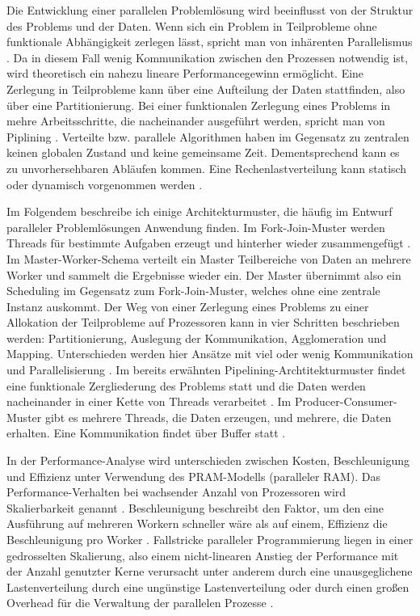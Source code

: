 \documentclass[a4paper,12pt,twoside]{article}
\begin{document}
Die Entwicklung einer parallelen Problemlösung wird beeinflusst von der Struktur des Problems und der Daten. Wenn sich ein Problem in Teilprobleme ohne funktionale Abhängigkeit zerlegen lässt, spricht man von inhärenten Parallelismus {\autocite[S. 321f]{Bengel2008}}. Da in diesem Fall wenig Kommunikation zwischen den Prozessen notwendig ist, wird theoretisch ein nahezu lineare Performancegewinn ermöglicht. Eine Zerlegung in Teilprobleme kann über eine Aufteilung der Daten stattfinden, also über eine Partitionierung. Bei einer funktionalen Zerlegung eines Problems in mehre Arbeitsschritte, die nacheinander ausgeführt werden, spricht man von Piplining {\autocite[S. 324]{Bengel2008}}. Verteilte bzw. parallele Algorithmen haben im Gegensatz zu zentralen keinen globalen Zustand und keine gemeinsame Zeit. Dementsprechend kann es zu unvorhersehbaren Abläufen kommen. Eine Rechenlastverteilung kann statisch oder dynamisch vorgenommen werden {\autocite{Bengel2008}}.

Im Folgendem beschreibe ich einige Architekturmuster, die häufig im Entwurf paralleler Problemlösungen Anwendung finden. Im Fork-Join-Muster werden Threads für bestimmte Aufgaben erzeugt und hinterher wieder zusammengefügt {\autocite[S. 109]{Rauber2013}}. Im Master-Worker-Schema verteilt ein Master Teilbereiche von Daten an mehrere Worker und sammelt die Ergebnisse wieder ein. Der Master übernimmt also ein Scheduling im Gegensatz zum Fork-Join-Muster, welches ohne eine zentrale Instanz auskommt. Der Weg von einer Zerlegung eines Problems zu einer Allokation der Teilprobleme auf Prozessoren kann in vier Schritten beschrieben werden: Partitionierung, Auslegung der Kommunikation, Agglomeration und Mapping. Unterschieden werden hier Ansätze mit viel oder wenig Kommunikation und Parallelisierung {\autocite[S. 326f]{Bengel2008}}. Im bereits erwähnten Pipelining-Archtitekturmuster findet eine funktionale Zergliederung des Problems statt und die Daten werden nacheinander in einer Kette von Threads verarbeitet {\autocite[S. 111]{Rauber2013}}. Im Producer-Consumer-Muster gibt es mehrere Threads, die Daten erzeugen, und mehrere, die Daten erhalten. Eine Kommunikation findet über Buffer statt  {\autocite[S. 112]{Rauber2013}}.

In der Performance-Analyse wird unterschieden zwischen Kosten, Beschleunigung und Effizienz unter Verwendung des PRAM-Modells (paralleler RAM). Das Performance-Verhalten bei wachsender Anzahl von Prozessoren wird Skalierbarkeit genannt {\cite{Rauber2013}}. Beschleunigung beschreibt den Faktor, um den eine Ausführung auf mehreren Workern schneller wäre als auf einem, Effizienz die Beschleunigung pro Worker {\autocite[S. 56]{McCool2012}}. Fallstricke paralleler Programmierung liegen in einer gedrosselten Skalierung, also einem nicht-linearen Anstieg der Performance mit der Anzahl genutzter Kerne verursacht unter anderem durch eine unausgeglichene Lastenverteilung durch eine ungünstige Lastenverteilung oder durch einen großen Overhead für die Verwaltung der parallelen Prozesse {\autocite[S. 74]{McCool2012}}.
\end{document}
